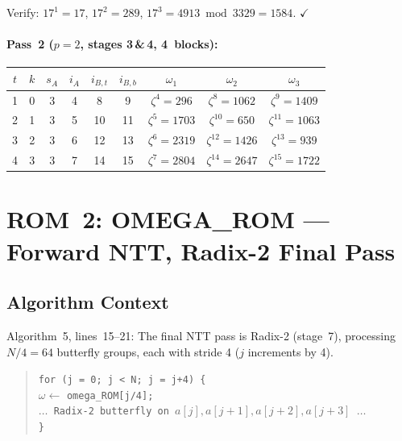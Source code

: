 \documentclass[11pt,a4paper]{article}
\newcommand{\rom}[1]{\textsc{#1}}
\begin{document}
Verify: $17^1 = 17$, $17^2 = 289$, $17^3 = 4913 \bmod 3329 = 1584$. $\checkmark$

\paragraph{Pass~2 ($p=2$, stages 3\,\&\,4, 4~blocks):}

\begin{center}
\begin{tabular}{ccccccccc}
\toprule
$t$ & $k$ & $s_A$ & $i_A$ & $i_{B,t}$ & $i_{B,b}$ & $\omega_1$ & $\omega_2$ & $\omega_3$ \\
\midrule
1 & 0 & 3 & 4  & 8  & 9  & $\zeta^4 = 296$   & $\zeta^8 = 1062$  & $\zeta^9 = 1409$ \\
2 & 1 & 3 & 5  & 10 & 11 & $\zeta^5 = 1703$  & $\zeta^{10} = 650$ & $\zeta^{11} = 1063$ \\
3 & 2 & 3 & 6  & 12 & 13 & $\zeta^6 = 2319$  & $\zeta^{12} = 1426$& $\zeta^{13} = 939$ \\
4 & 3 & 3 & 7  & 14 & 15 & $\zeta^7 = 2804$  & $\zeta^{14} = 2647$& $\zeta^{15} = 1722$ \\
\bottomrule
\end{tabular}
\end{center}

\section{ROM~2: \rom{OMEGA\_ROM} --- Forward NTT, Radix-2 Final Pass}
\label{sec:omega-rom}

\subsection{Algorithm Context}

Algorithm~5, lines~15--21: The final NTT pass is Radix-2 (stage~7), processing $N/4 = 64$ butterfly groups, each with stride 4 ($j$ increments by 4).

\begin{quote}
\texttt{for (j = 0; j < N; j = j+4) \{}\\
\quad $\omega \leftarrow$ \texttt{omega\_ROM[j/4];}\\
\quad\quad \texttt{$\ldots$ Radix-2 butterfly on $a[j], a[j+1], a[j+2], a[j+3]$ $\ldots$}\\
\texttt{\}}
\end{quote}
\end{document}
